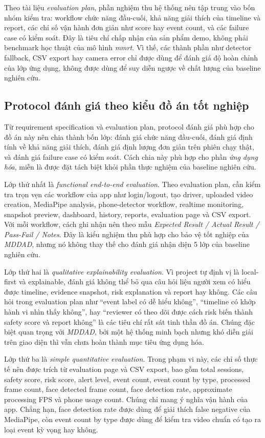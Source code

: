 \documentclass[conference,a4paper]{IEEEtran}
\begin{document}
Theo tài liệu \textit{evaluation plan}, phần nghiệm thu hệ thống nên tập trung vào bốn nhóm kiểm tra: workflow chức năng đầu-cuối, khả năng giải thích của timeline và report, các chỉ số vận hành đơn giản như score hay event count, và các failure case có kiểm soát. Đây là tiêu chí chấp nhận của sản phẩm demo, không phải benchmark học thuật của mô hình \textit{mmrt}. Vì thế, các thành phần như detector fallback, CSV export hay camera error chỉ được dùng để đánh giá độ hoàn chỉnh của lớp ứng dụng, không được dùng để suy diễn ngược về chất lượng của baseline nghiên cứu.

\subsection{Protocol đánh giá theo kiểu đồ án tốt nghiệp}
Từ requirement specification và evaluation plan, protocol đánh giá phù hợp cho đồ án này nên chia thành bốn lớp: đánh giá chức năng đầu-cuối, đánh giá định tính về khả năng giải thích, đánh giá định lượng đơn giản trên phiên chạy thật, và đánh giá failure case có kiểm soát. Cách chia này phù hợp cho phần \textit{ứng dụng hóa}, miễn là được đặt tách biệt khỏi phần thực nghiệm của baseline nghiên cứu.

Lớp thứ nhất là \textit{functional end-to-end evaluation}. Theo evaluation plan, cần kiểm tra trọn vẹn các workflow của app như login/logout, tạo driver, uploaded video creation, MediaPipe analysis, phone-detector workflow, realtime monitoring, snapshot preview, dashboard, history, reports, evaluation page và CSV export. Với mỗi workflow, cách ghi nhận nên theo mẫu \textit{Expected Result / Actual Result / Pass-Fail / Notes}. Đây là kiểu nghiệm thu phù hợp cho bảo vệ tốt nghiệp của \textit{MDDAD}, nhưng nó không thay thế cho đánh giá nhận diện 5 lớp của baseline nghiên cứu.

Lớp thứ hai là \textit{qualitative explainability evaluation}. Vì project tự định vị là local-first và explainable, đánh giá không thể bỏ qua câu hỏi liệu người xem có hiểu được timeline, evidence snapshot, risk explanation và report hay không. Các câu hỏi trong evaluation plan như ``event label có dễ hiểu không'', ``timeline có khớp hành vi nhìn thấy không'', hay ``reviewer có theo dõi được cách risk biến thành safety score và report không'' là các tiêu chí rất sát tinh thần đồ án. Chúng đặc biệt quan trọng với \textit{MDDAD}, bởi một hệ thống minh bạch nhưng khó diễn giải trên giao diện thì vẫn chưa hoàn thành mục tiêu ứng dụng hóa.

Lớp thứ ba là \textit{simple quantitative evaluation}. Trong phạm vi này, các chỉ số thực tế nên được trích từ evaluation page và CSV export, bao gồm total sessions, safety score, risk score, alert level, event count, event count by type, processed frame count, face detected frame count, face detection rate, approximate processing FPS và phone usage count. Chúng chỉ mang ý nghĩa vận hành của app. Chẳng hạn, face detection rate được dùng để giải thích false negative của MediaPipe, còn event count by type được dùng để kiểm tra video chuẩn có tạo ra loại event kỳ vọng hay không.
\end{document}
